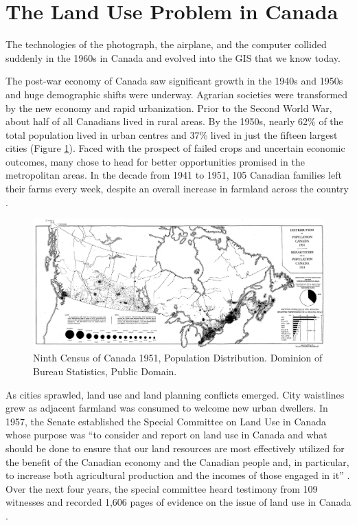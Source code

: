 \documentclass[
]{book}
\begin{document}
\section{The Land Use Problem in Canada}\label{the-land-use-problem-in-canada}

The technologies of the photograph, the airplane, and the computer collided suddenly in the 1960s in Canada and evolved into the GIS that we know today.

The post-war economy of Canada saw significant growth in the 1940s and 1950s and huge demographic shifts were underway. Agrarian societies were transformed by the new economy and rapid urbanization. Prior to the Second World War, about half of all Canadians lived in rural areas. By the 1950s, nearly 62\% of the total population lived in urban centres and 37\% lived in just the fifteen largest cities (Figure \ref{fig:1-ninth-census-1951-map}). Faced with the prospect of failed crops and uncertain economic outcomes, many chose to head for better opportunities promised in the metropolitan areas. In the decade from 1941 to 1951, 105 Canadian families left their farms every week, despite an overall increase in farmland across the country \citep{dominion_bureau_of_statistics_volume_1944} \citep{dominion_bureau_of_statistics_number_1952}.

\begin{figure}
\includegraphics[width=0.75\linewidth]{images/01-ninth-census-1951-map} \caption{Ninth Census of Canada 1951, Population Distribution. Dominion of Bureau Statistics, Public Domain.}\label{fig:1-ninth-census-1951-map}
\end{figure}

As cities sprawled, land use and land planning conflicts emerged. City waistlines grew as adjacent farmland was consumed to welcome new urban dwellers. In 1957, the Senate established the Special Committee on Land Use in Canada whose purpose was ``to consider and report on land use in Canada and what should be done to ensure that our land resources are most effectively utilized for the benefit of the Canadian economy and the Canadian people and, in particular, to increase both agricultural production and the incomes of those engaged in it'' \citep{the_senate_of_canada_minutes_1957}. Over the next four years, the special committee heard testimony from 109 witnesses and recorded 1,606 pages of evidence on the issue of land use in Canada \citep{special_committee_on_land_use_in_canada_consolidation_1963}.
\end{document}
